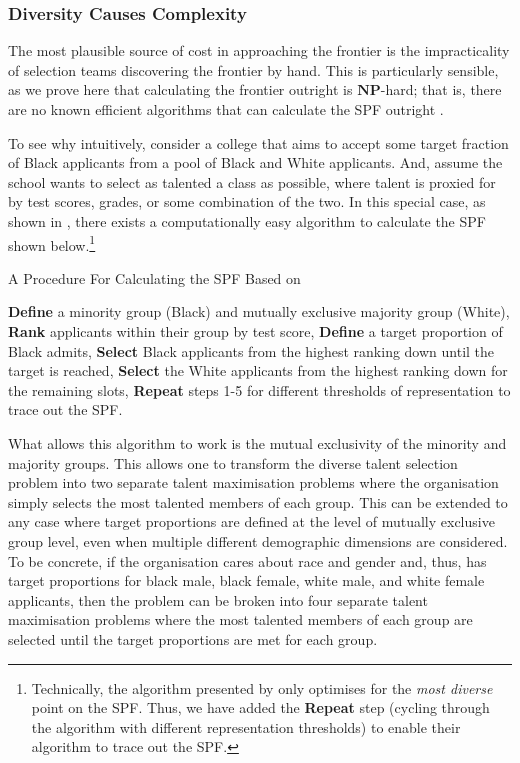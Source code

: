 \subsubsection{Diversity Causes Complexity}\label{subsubsec:nphard}
The most plausible source of cost in approaching the frontier is the impracticality of selection teams discovering the frontier by hand. This is particularly sensible, as we prove here that calculating the frontier outright is $\mathbf{NP}$-hard; that is, there are no known efficient algorithms that can calculate the SPF outright \cite{COPPERSMITH198527}.

To see why intuitively, consider a college that aims to accept some target fraction of Black applicants from a pool of Black and White applicants. And, assume the school wants to select as talented a class as possible, where talent is proxied for by test scores, grades, or some combination of the two. In this special case, as shown in \textcite{kleinberg2018algorithmic}, there exists a computationally easy algorithm to calculate the SPF shown below.\footnote{Technically, the algorithm presented by \textcite{kleinberg2018algorithmic} only optimises for the \emph{most diverse} point on the SPF. Thus, we have added the \textbf{Repeat} step (cycling through the algorithm with different representation thresholds) to enable their algorithm to trace out the SPF.}

\begin{algorithm}
    \caption{A Procedure For Calculating the SPF Based on \textcite{kleinberg2018algorithmic}}\label{alg:kleinberg}
    \begin{algorithmic}
        \State \textbf{Define} a minority group (Black) and mutually exclusive majority group (White), 
        \State \textbf{Rank} applicants within their group by test score,
        \State \textbf{Define} a target proportion of Black admits,
        \State \textbf{Select} Black applicants from the highest ranking down until the target is reached,
        \State \textbf{Select} the White applicants from the highest ranking down for the remaining slots,
        \State \textbf{Repeat} steps 1-5 for different thresholds of representation to trace out the SPF.
    \end{algorithmic}
\end{algorithm}

What allows this algorithm to work is the mutual exclusivity of the minority and majority groups. This allows one to transform the diverse talent selection problem into two separate talent maximisation problems where the organisation simply selects the most talented members of each group. This can be extended to any case where target proportions are defined at the level of mutually exclusive group level, even when multiple different demographic dimensions are considered. To be concrete, if the organisation cares about race and gender and, thus, has target proportions for black male, black female, white male, and white female applicants, then the problem can be broken into four separate talent maximisation problems where the most talented members of each group are selected until the target proportions are met for each group. 

